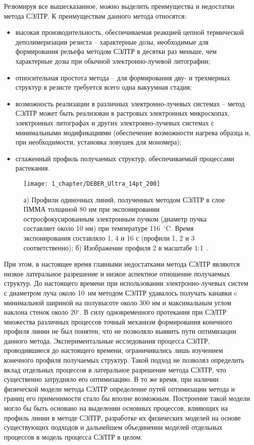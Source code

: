 Резюмируя все вышесказанное, можно выделить преимущества и недостатки метода СЭЛТР.
К преимуществам данного метода относятся:
\begin{itemize}
	\item высокая производительность, обеспечиваемая реакцией цепной термической деполимеризации резиста -- характерные дозы, необходимые для формирования рельефа методом СЭЛТР в десятки раз меньше, чем характерные дозы при обычной электронно-лучевой литографии;
	\item относительная простота метода -- для формирования дву- и трехмерных структур в резисте требуется всего одна вакуумная стадия;
	\item возможность реализации в различных электронно-лучевых системах -- метод СЭЛТР может быть реализован в растровых электронных микроскопах, электронных литографах и других электронно-лучевых системах с минимальными модификациями (обеспечение возможности нагрева образца и, при необходимости, установка ловушек для мономера);
	\item сглаженный профиль получаемых структур, обеспечиваемый процессами растекания.
\end{itemize}

\begin{figure}[t]
	\centering
	\texttt{[image: 1\_chapter/DEBER\_Ultra\_14pt\_200]}
	\caption{а) Профили одиночных линий, полученных методом СЭЛТР в слое ПММА толщиной 80 нм при экспонировании остросфокусированным электронным пучком (диаметр пучка составляет около 10 нм) при температуре 116~$^\circ$C. Время экспонирования составляло 1, 4 и 16 с (профили 1, 2 и 3 соответственно); б) Изображение профиля 2 в масштабе 1:1~\cite{Bruk_2016_mee}.}
	\label{fig:DEBER_Ultra}
\end{figure}

При этом, в настоящее время главными недостатками метода СЭЛТР являются низкое латеральное разрешение и низкое аспектное отношение получаемых структур.
До настоящего времени при использовании электронно-лучевых систем с диаметром луча около 10~нм методом СЭЛТР удавалось получать канавки c минимальной шириной на полувысоте около 300 нм и максимальным углом наклона стенок около 20$^\circ$.
В силу одновременного протекания при СЭЛТР множества различных процессов точный механизм формирования конечного профиля линии не был понятен, что не позволяло выявить пути оптимизации данного метода.
Экспериментальные исследования процесса СЭЛТР, проводившиеся до настоящего времени, ограничивались лишь изучением конечного профиля получаемых структур.
Такой подход не позволял определить вклад отдельных процессов в латеральное разрешение метода СЭЛТР, что существенно затрудняло его оптимизацию.
В то же время, при наличии физической модели метода СЭЛТР определение путей оптимизации метода и границ его применимости стало бы вполне возможным.
Построение такой модели могло бы быть основано на выделении основных процессов, влияющих на профиль линии в методе СЭЛТР, разработке их физических моделей на основе существующих подходов и дальнейшем объединении моделей отдельных процессов в модель процесса СЭЛТР в целом.
